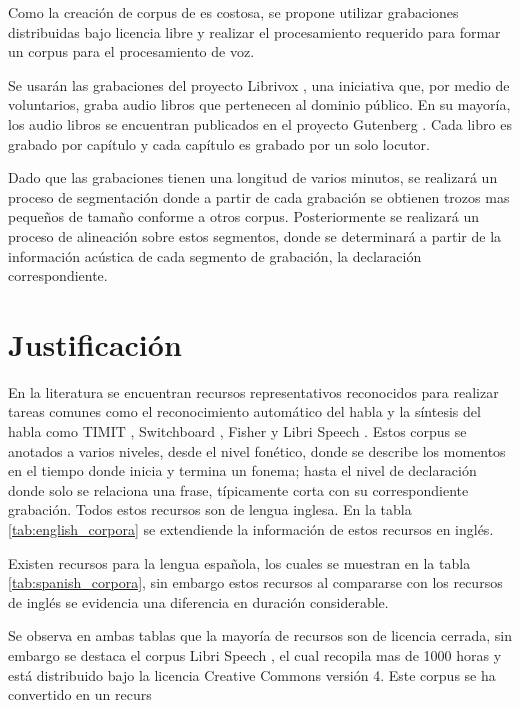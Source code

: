 Como la creación de corpus de es costosa, se propone utilizar grabaciones distribuidas bajo licencia libre y realizar el procesamiento requerido para formar un corpus para el procesamiento de voz.

Se usarán las grabaciones del proyecto Librivox \cite{LibriVox}, una iniciativa que, por medio de voluntarios, graba audio libros que pertenecen al dominio público. En su mayoría, los audio libros se encuentran publicados en el proyecto Gutenberg \cite{gutenberg}. Cada libro es grabado por capítulo y cada capítulo es grabado por un solo locutor.

Dado que las grabaciones tienen una longitud de varios minutos, se realizará un proceso de segmentación donde a partir de cada grabación se obtienen trozos mas pequeños de tamaño conforme a otros corpus. Posteriormente se realizará un proceso de alineación sobre estos segmentos, donde se determinará a partir de la información acústica de cada segmento de grabación, la declaración correspondiente.


\section{Justificación}

En la literatura se encuentran recursos representativos reconocidos para realizar tareas comunes como el reconocimiento automático del habla y la síntesis del habla como TIMIT \cite{PriceTheRecognition}, Switchboard \cite{Godfrey1992SWITCHBOARD:Development}, Fisher \cite{CieriTheSpeech-to-Text} y Libri Speech \cite{PanayotovLIBRISPEECH:BOOKS}. Estos corpus se anotados a varios niveles, desde el nivel fonético, donde se describe los momentos en el tiempo donde inicia y termina un fonema; hasta el nivel de declaración donde solo se relaciona una frase, típicamente corta con su correspondiente grabación. Todos estos recursos son de lengua inglesa. En la tabla \ref{tab:english_corpora} se extendiende la información de estos recursos en inglés.



Existen recursos para la lengua española, los cuales se muestran en la tabla \ref{tab:spanish_corpora}, sin embargo estos recursos al compararse con los recursos de inglés se evidencia una diferencia en duración considerable.



Se observa en ambas tablas que la mayoría de recursos son de licencia cerrada, sin embargo se destaca el corpus Libri Speech \cite{LIBRISPEECH}, el cual recopila mas de 1000 horas y está distribuido bajo la licencia Creative Commons versión 4. Este corpus se ha convertido en un recurs


